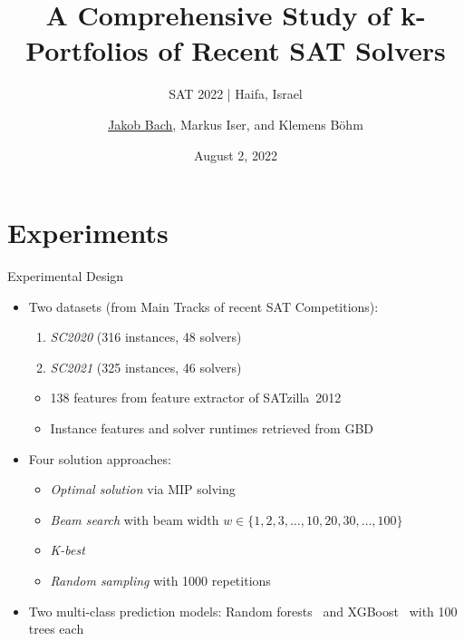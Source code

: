 \documentclass[en]{sdqbeamer}
\title[A Comprehensive Study of k-Portfolios of Recent SAT Solvers]{A Comprehensive Study of k-Portfolios of Recent SAT Solvers} %
\subtitle{SAT 2022 | Haifa, Israel}
\author[\underline{Jakob Bach}, Markus Iser, and Klemens Böhm]{\underline{Jakob Bach}, Markus Iser, and Klemens Böhm} %
\date[2022-08-02]{August 2, 2022} %
\begin{document}
\KITtitleframe

\section{Experiments}

\begin{frame}[t]{Experimental Design}
	\begin{itemize}
		\item Two datasets (from Main Tracks of recent SAT Competitions):
		\begin{enumerate}[1)]
			\item \emph{SC2020} (316 instances, 48 solvers)~\cite{balyo2020proceedings}
			\item \emph{SC2021} (325 instances, 46 solvers)~\cite{balyo2021proceedings}
		\end{enumerate}
		\begin{itemize}
			\item 138 features from feature extractor of SATzilla~2012~\cite{xu2012features, xu2012satzilla2012}
			\item Instance features and solver runtimes retrieved from GBD~\cite{iser2020collaborative}
		\end{itemize}
		\pause
		\vspace{\baselineskip}
		\item Four solution approaches:
		\begin{itemize}
			\item \emph{Optimal solution} via MIP solving~\cite{python-mip}
			\item \emph{Beam search} with beam width $w \in \{1, 2, 3, \dots, 10, 20, 30, \dots, 100\}$
			\item \emph{K-best}
			\item \emph{Random sampling} with 1000 repetitions
		\end{itemize}
		\pause
		\vspace{\baselineskip}
		\item Two multi-class prediction models: Random forests~\cite{breiman2001random, scikit-learn} and XGBoost~\cite{xgboost} with 100 trees each
	\end{itemize}
\end{frame}
\end{document}
